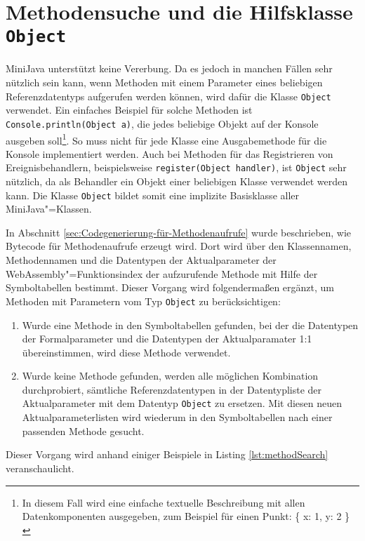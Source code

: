 \pagebreak
\section{Methodensuche und die Hilfsklasse \lstinline{Object}}

MiniJava unterstützt keine Vererbung. Da es jedoch in manchen Fällen sehr nützlich sein kann, wenn Methoden mit einem Parameter eines beliebigen Referenzdatentyps aufgerufen werden können, wird dafür die Klasse \lstinline{Object} verwendet. Ein einfaches Beispiel für solche Methoden ist \lstinline{Console.println(Object a)}, die jedes beliebige Objekt auf der Konsole ausgeben soll\footnote{In diesem Fall wird eine einfache textuelle Beschreibung mit allen Datenkomponenten ausgegeben, zum Beispiel für einen Punkt: {\ttfamily \{{} x: 1, y: 2 \}{} }}. So muss nicht für jede Klasse eine Ausgabemethode für die Konsole implementiert werden. Auch bei Methoden für das Registrieren von Ereignisbehandlern, beispielsweise \lstinline{register(Object handler)}, ist \lstinline{Object} sehr nützlich, da als Behandler ein Objekt einer beliebigen Klasse verwendet werden kann. Die Klasse \lstinline{Object} bildet somit eine implizite Basisklasse aller MiniJava"=Klassen.

In Abschnitt \ref{sec:Codegenerierung-für-Methodenaufrufe} wurde beschrieben, wie Bytecode für Methodenaufrufe erzeugt wird. Dort wird über den Klassennamen, Methodennamen und die Datentypen der Aktualparameter der WebAssembly"=Funktionsindex der aufzurufende Methode mit Hilfe der Symboltabellen bestimmt. Dieser Vorgang wird folgendermaßen ergänzt, um Methoden mit Parametern vom Typ \lstinline{Object} zu berücksichtigen:

\begin{enumerate}
    \item Wurde eine Methode in den Symboltabellen gefunden, bei der die Datentypen der Formalparameter und die Datentypen der Aktualparamater 1:1 übereinstimmen, wird diese Methode verwendet.
    \item Wurde keine Methode gefunden, werden alle möglichen Kombination durchprobiert, sämtliche Referenzdatentypen in der Datentypliste der Aktualparameter mit dem Datentyp \lstinline{Object} zu ersetzen. Mit diesen neuen Aktualparameterlisten wird wiederum in den Symboltabellen nach einer passenden Methode gesucht.
\end{enumerate}

Dieser Vorgang wird anhand einiger Beispiele in Listing \ref{lst:methodSearch} veranschaulicht.

